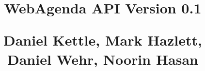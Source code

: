 \documentclass[letterpaper,12pt]{report}
\begin{document}
{
  \centering
    \title{WebAgenda API Version 0.1 \linebreak
	    \begin{small} \linebreak
		Daniel Kettle, Mark Hazlett, Daniel Wehr, Noorin Hasan
	    \end{small}}

    \author{}

    \maketitle
}


\end{document}

